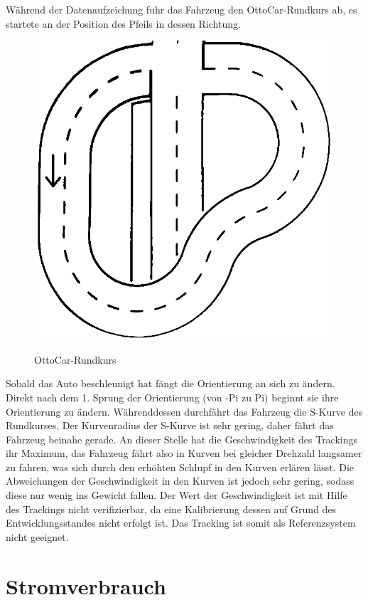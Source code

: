 Während der Datenaufzeichung fuhr das Fahrzeug den OttoCar-Rundkurs ab, es startete  an der Position des Pfeils in dessen Richtung.


\begin{figure}[H]
\centering
\includegraphics[width=.8\textwidth]{Strasse_mono.png}\\
\caption{OttoCar-Rundkurs}%
\label{fig:strasse}
\end{figure}

Sobald das Auto beschleunigt hat fängt die Orientierung an sich zu ändern. Direkt nach dem 1. Sprung der Orientierung (von -Pi zu Pi)
 beginnt sie ihre Orientierung zu ändern. Währenddessen durchfährt das Fahrzeug die S-Kurve des Rundkurses, Der Kurvenradius der S-Kurve ist sehr gering, daher fährt das Fahrzeug
 beinahe gerade. An dieser Stelle hat die Geschwindigkeit des Trackings ihr Maximum, das Fahrzeug fährt also in  Kurven bei gleicher Drehzahl langsamer zu fahren, was sich durch
 den erhöhten Schlupf in den Kurven erlären lässt. Die Abweichungen der Geschwindigkeit in den Kurven ist jedoch sehr gering, sodass diese nur wenig ins Gewicht fallen.
 Der Wert der Geschwindigkeit ist mit Hilfe des Trackings nicht verifizierbar, da eine Kalibrierung dessen auf Grund des Entwicklungsstandes nicht erfolgt ist.
 Das Tracking ist somit als Referenzsystem nicht geeignet.
 
 
\section{Stromverbrauch}

